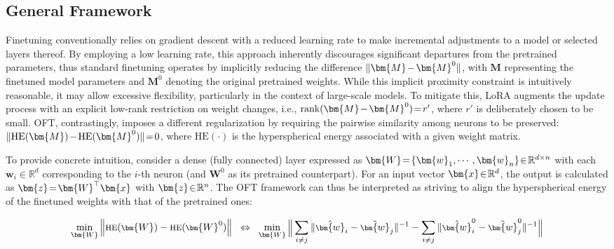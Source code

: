 \subsection{General Framework}

Finetuning conventionally relies on gradient descent with a reduced learning rate to make incremental adjustments to a model or selected layers thereof. By employing a low learning rate, this approach inherently discourages significant departures from the pretrained parameters, thus standard finetuning operates by implicitly reducing the difference $\thickmuskip=2mu \medmuskip=2mu \| \bm{M} - \bm{M}^0\|$, with $\bm{M}$ representing the finetuned model parameters and $\bm{M}^0$ denoting the original pretrained weights. While this implicit proximity constraint is intuitively reasonable, it may allow excessive flexibility, particularly in the context of large-scale models. To mitigate this, LoRA augments the update process with an explicit low-rank restriction on weight changes, i.e., $\thickmuskip=2mu \medmuskip=2mu \text{rank}(\bm{M} - \bm{M}^0)=r'$, where $r'$ is deliberately chosen to be small. OFT, contrastingly, imposes a different regularization by requiring the pairwise similarity among neurons to be preserved: $\thickmuskip=2mu \medmuskip=2mu \| \text{HE}(\bm{M})-\text{HE}(\bm{M}^0) \|=0$, where $\text{HE}(\cdot)$ is the hyperspherical energy associated with a given weight matrix.

To provide concrete intuition, consider a dense (fully connected) layer expressed as $\thickmuskip=2mu \medmuskip=2mu \bm{W}=\{\bm{w}_1,\cdots,\bm{w}_n\}\in\mathbb{R}^{d\times n}$ with each $\bm{w}_i\in\mathbb{R}^{d}$ corresponding to the $i$-th neuron (and $\bm{W}^0$ as its pretrained counterpart). For an input vector $\thickmuskip=2mu \medmuskip=2mu \bm{x}\in\mathbb{R}^d$, the output is calculated as $\thickmuskip=2mu \medmuskip=2mu \bm{z}=\bm{W}^\top\bm{x}$ with $\thickmuskip=2mu \medmuskip=2mu \bm{z}\in\mathbb{R}^n$. The OFT framework can thus be interpreted as striving to align the hyperspherical energy of the finetuned weights with that of the pretrained ones:

\begin{equation}\label{eq:oft_principle}
\footnotesize
\min_{\bm{W}} \left\| \text{HE}(\bm{W})-\text{HE}(\bm{W}^0)\right\|~~\Leftrightarrow~~\min_{\bm{W}} \bigg{\|} \sum_{i\neq j} \|\hat{\bm{w}}_i-\hat{\bm{w}}_j\|^{-1}-\sum_{i\neq j} \|\hat{\bm{w}}^0_i-\hat{\bm{w}}^0_j\|^{-1}\bigg{\|}
\end{equation}

